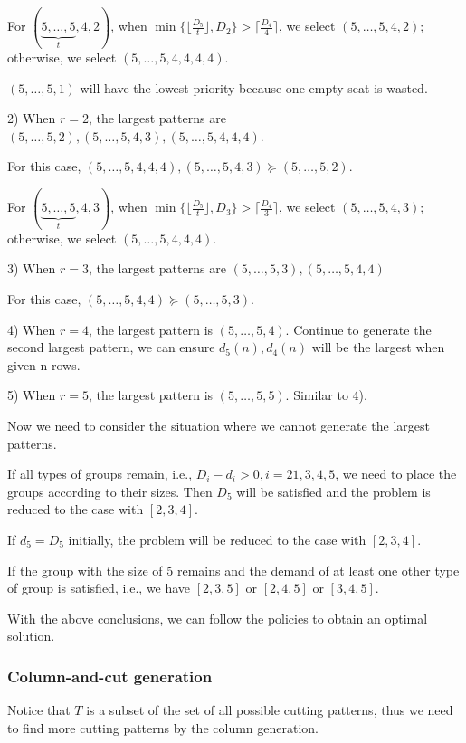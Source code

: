 For $(\underbrace{5,\ldots,5}_{t},4,2)$, when $\min\{\lfloor \frac{D_5}{t} \rfloor, D_2\} > \lceil \frac{D_4}{4} \rceil$, we select $(5,\ldots,5,4,2)$; otherwise, we select $(5,\ldots,5,4,4,4,4)$.

$(5,\ldots,5,1)$ will have the lowest priority because one empty seat is wasted.

2) When $r=2$, the largest patterns are $(5,\ldots,5,2), (5,\ldots,5,4,3), (5,\ldots,5,4,4,4)$.

For this case, $(5,\ldots,5,4,4,4), (5,\ldots,5,4,3) \succeq (5,\ldots,5,2)$.

For $(\underbrace{5,\ldots,5}_{t},4,3)$, when $\min\{\lfloor \frac{D_5}{t} \rfloor, D_3\} > \lceil \frac{D_4}{3} \rceil$, we select $(5,\ldots,5,4,3)$; otherwise, we select $(5,\ldots,5,4,4,4)$.

3) When $r=3$, the largest patterns are $(5,\ldots,5,3), (5,\ldots,5,4,4)$

For this case, $(5,\ldots,5,4,4) \succeq (5,\ldots,5,3)$.

4) When $r=4$, the largest pattern is $(5,\ldots,5,4)$. Continue to generate the second largest pattern, we can ensure $d_5(n), d_4(n)$ will be the largest when given n rows.

5) When $r=5$, the largest pattern is $(5,\ldots,5,5)$. Similar to 4).

Now we need to consider the situation where we cannot generate the largest patterns.

If all types of groups remain, i.e., $D_i - d_i >0, i=21,3,4,5$, we need to place the groups according to their sizes. Then $D_5$ will be satisfied and the problem is reduced to the case with $[2,3,4]$.

If $d_5 = D_5$ initially, the problem will be reduced to the case with $[2,3,4]$.

If the group with the size of 5 remains and the demand of at least one other type of group is satisfied, i.e., we have $[2,3,5]$ or $[2,4,5]$ or $[3,4,5]$.

With the above conclusions, we can follow the policies to obtain an optimal solution.

\subsubsection{Column-and-cut generation}

Notice that $T$ is a subset of the set of all possible cutting patterns, thus we need to find more cutting patterns by the column generation.


